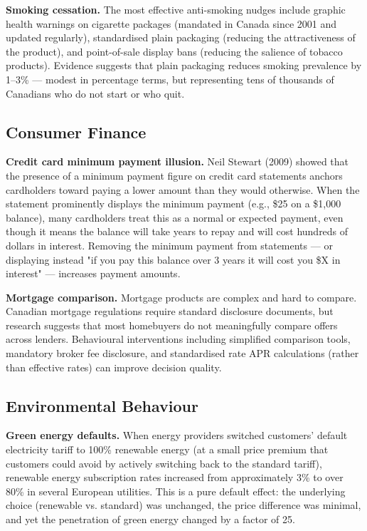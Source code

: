 \documentclass[12pt, letterpaper]{article}
\begin{document}
\textbf{Smoking cessation.} The most effective anti-smoking nudges include graphic health warnings on cigarette packages (mandated in Canada since 2001 and updated regularly), standardised plain packaging (reducing the attractiveness of the product), and point-of-sale display bans (reducing the salience of tobacco products). Evidence suggests that plain packaging reduces smoking prevalence by 1--3\% --- modest in percentage terms, but representing tens of thousands of Canadians who do not start or who quit.


\subsection{Consumer Finance}


\textbf{Credit card minimum payment illusion.} Neil Stewart (2009) showed that the presence of a minimum payment figure on credit card statements anchors cardholders toward paying a lower amount than they would otherwise. When the statement prominently displays the minimum payment (e.g., \$25 on a \$1,000 balance), many cardholders treat this as a normal or expected payment, even though it means the balance will take years to repay and will cost hundreds of dollars in interest. Removing the minimum payment from statements --- or displaying instead "if you pay this balance over 3 years it will cost you \$X in interest" --- increases payment amounts.

\textbf{Mortgage comparison.} Mortgage products are complex and hard to compare. Canadian mortgage regulations require standard disclosure documents, but research suggests that most homebuyers do not meaningfully compare offers across lenders. Behavioural interventions including simplified comparison tools, mandatory broker fee disclosure, and standardised rate APR calculations (rather than effective rates) can improve decision quality.


\subsection{Environmental Behaviour}


\textbf{Green energy defaults.} When energy providers switched customers' default electricity tariff to 100\% renewable energy (at a small price premium that customers could avoid by actively switching back to the standard tariff), renewable energy subscription rates increased from approximately 3\% to over 80\% in several European utilities. This is a pure default effect: the underlying choice (renewable vs. standard) was unchanged, the price difference was minimal, and yet the penetration of green energy changed by a factor of 25.
\end{document}
